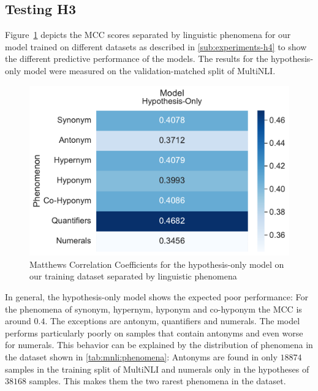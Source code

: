 \subsection{Testing H3}
Figure~\ref{fig:metric-heatmap-phenomena-mcc-hyponly} depicts the \ac{MCC} scores separated by linguistic phenomena for our model trained on different datasets as described in \autoref{sub:experiments-h4} to show the different predictive performance of the models. The results for the hypothesis-only model were measured on the validation-matched split of \ac{MultiNLI}.

\begin{figure}[ht!]
    \centering
    \includegraphics[width=0.9\columnwidth]{./images/metric_heatmaps_phenomena/important_words/hypothesis_only_matthews_correlation.pdf}
    \caption{Matthews Correlation Coefficients for the hypothesis-only model on our training dataset separated by linguistic phenomena}
    \label{fig:metric-heatmap-phenomena-mcc-hyponly}
\end{figure}

In general, the hypothesis-only model shows the expected poor performance: For the phenomena of synonym, hypernym, hyponym and co-hyponym the \ac{MCC} is around $0.4$. The exceptions are antonym, quantifiers and numerals. The model performs particularly poorly on samples that contain antonyms and even worse for numerals. This behavior can be explained by the distribution of phenomena in the dataset shown in \autoref{tab:mnli:phenomena}: Antonyms are found in only $18874$ samples in the training split of \ac{MultiNLI} and numerals only in the hypotheses of $38168$ samples. This makes them the two rarest phenomena in the dataset. 


